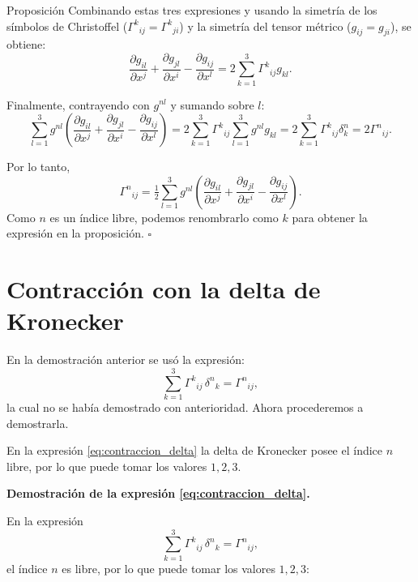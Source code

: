 \documentclass[../apunte_mecanica_clasica.tex]{subfiles}%
\begin{document}
\begin{apuntebloque}{Proposición}
Combinando estas tres expresiones y usando la simetría de los símbolos de Christoffel ($\Gamma^k{}_{ij} = \Gamma^k{}_{ji}$) y la simetría del tensor métrico ($g_{ij} = g_{ji}$), se obtiene:
\begin{equation*}
    \frac{\partial g_{il}}{\partial x^j} 
    + \frac{\partial g_{jl}}{\partial x^i} 
    - \frac{\partial g_{ij}}{\partial x^l}
    = 2 \sum_{k=1}^3 \Gamma^k{}_{ij} g_{kl}.
\end{equation*}

Finalmente, contrayendo con $g^{nl}$ y sumando sobre $l$:
\begin{equation*}
    \sum_{l=1}^3 g^{nl} \left( \frac{\partial g_{il}}{\partial x^j} 
         + \frac{\partial g_{jl}}{\partial x^i} 
         - \frac{\partial g_{ij}}{\partial x^l} \right)
    = 2 \sum_{k=1}^3 \Gamma^k{}_{ij} \sum_{l=1}^3 g^{nl} g_{kl}
    = 2 \sum_{k=1}^3 \Gamma^k{}_{ij} \delta^n_k
    = 2 \Gamma^n{}_{ij}.
\end{equation*}

Por lo tanto,
\begin{equation*}
    \Gamma^n{}_{ij} = \tfrac{1}{2} \sum_{l=1}^3 g^{nl}
    \left( \frac{\partial g_{il}}{\partial x^j}
         + \frac{\partial g_{jl}}{\partial x^i}
         - \frac{\partial g_{ij}}{\partial x^l} \right).
\end{equation*}
Como $n$ es un índice libre, podemos renombrarlo como $k$ para obtener la expresión en la proposición.
\hfill $\square$
\end{apuntebloque}


\section{Contracción con la delta de Kronecker}

En la demostración anterior se usó la expresión:
\begin{equation}\label{eq:contraccion_delta}
    \sum_{k=1}^3 \Gamma^k{}_{ij}\,\delta^n{}_k = \Gamma^n{}_{ij},
\end{equation}
la cual no se había demostrado con anterioridad.  
Ahora procederemos a demostrarla.  

En la expresión \eqref{eq:contraccion_delta} la delta de Kronecker 
posee el índice $n$ libre, por lo que puede tomar los valores 
$1,2,3$.

\textbf{Demostración de la expresión \eqref{eq:contraccion_delta}.}  

En la expresión
\[
    \sum_{k=1}^3 \Gamma^k{}_{ij}\,\delta^n{}_k = \Gamma^n{}_{ij},
\]
el índice $n$ es libre, por lo que puede tomar los valores $1,2,3$:
\end{document}
